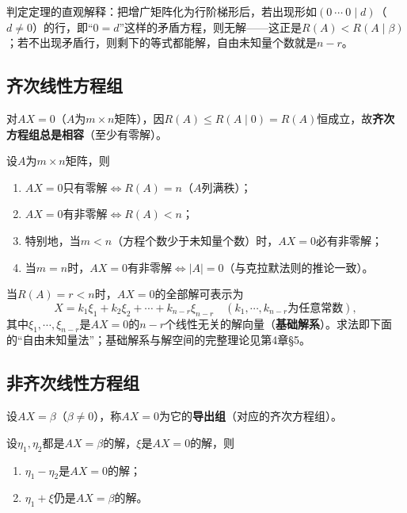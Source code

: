 
判定定理的直观解释：把增广矩阵化为行阶梯形后，若出现形如$(0\ \cdots\ 0\mid d)$（$d\neq0$）的行，即“$0=d$”这样的矛盾方程，则无解——这正是$R(A)<R(A\mid\beta)$；若不出现矛盾行，则剩下的等式都能解，自由未知量个数就是$n-r$。

\subsection{齐次线性方程组}

对$AX=0$（$A$为$m\times n$矩阵），因$R(A)\le R(A\mid 0)=R(A)$恒成立，故\textbf{齐次方程组总是相容}（至少有零解）。

\begin{theorem}
设$A$为$m\times n$矩阵，则
\begin{enumerate}
\item $AX=0$只有零解$\iff R(A)=n$（$A$列满秩）；
\item $AX=0$有非零解$\iff R(A)<n$；
\item 特别地，当$m<n$（方程个数少于未知量个数）时，$AX=0$必有非零解；
\item 当$m=n$时，$AX=0$有非零解$\iff|A|=0$（与克拉默法则的推论一致）。
\end{enumerate}
\end{theorem}

当$R(A)=r<n$时，$AX=0$的全部解可表示为
\[
X=k_1\xi_1+k_2\xi_2+\cdots+k_{n-r}\xi_{n-r}\quad(k_1,\cdots,k_{n-r}\text{为任意常数}),
\]
其中$\xi_1,\cdots,\xi_{n-r}$是$AX=0$的$n-r$个线性无关的解向量（\textbf{基础解系}）。求法即下面的“自由未知量法”；基础解系与解空间的完整理论见第4章§5。

\subsection{非齐次线性方程组}

设$AX=\beta$（$\beta\neq0$），称$AX=0$为它的\textbf{导出组}（对应的齐次方程组）。

\begin{theorem}
设$\eta_1,\eta_2$都是$AX=\beta$的解，$\xi$是$AX=0$的解，则
\begin{enumerate}
\item $\eta_1-\eta_2$是$AX=0$的解；
\item $\eta_1+\xi$仍是$AX=\beta$的解。
\end{enumerate}
\end{theorem}

